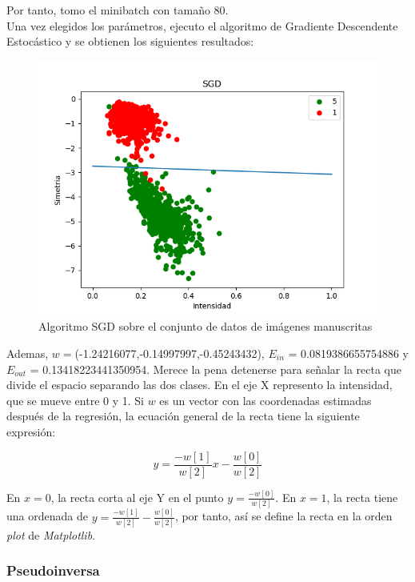 Por tanto, tomo el minibatch con tamaño 80.\\

Una vez elegidos los parámetros, ejecuto el algoritmo de Gradiente Descendente Estocástico y se obtienen los siguientes resultados:

\begin{figure}[H] %
	\centering
	\includegraphics[scale=0.6]{sgd.png}  %
	\caption{Algoritmo SGD sobre el conjunto de datos de imágenes manuscritas} 
	\label{fig:sgd}
\end{figure}

Ademas, $w=$(-1.24216077,-0.14997997,-0.45243432), $E_{in}$ = 0.0819386655754886 y $E_{out}$ = 0.13418223441350954.
Merece la pena detenerse para señalar la recta que divide el espacio separando las dos clases. En el eje X represento la intensidad, que se mueve entre 0 y 1. Si $w$ es un vector con las coordenadas estimadas después de la regresión, la ecuación general de la recta tiene la siguiente expresión:

$$y = \frac{-w[1]}{w[2]}x - \frac{w[0]}{w[2]}$$

En $x=0$, la recta corta al eje Y en el punto $y = \frac{-w[0]}{w[2]}$. En $x=1$, la recta tiene una ordenada de $y=\frac{-w[1]}{w[2]}- \frac{w[0]}{w[2]}$, por tanto, así se define la recta en la orden \textit{plot} de \textit{Matplotlib}.

\subsubsection{Pseudoinversa}

